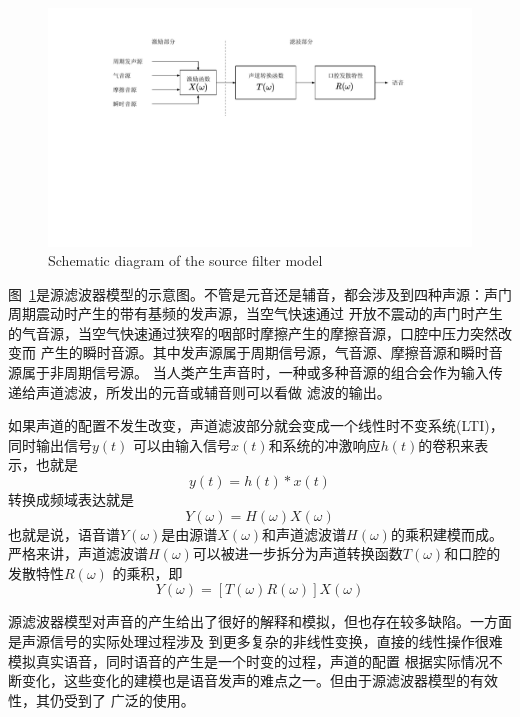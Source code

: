 \begin{figure}[!htp]
    \centering
    \includegraphics[width=13cm,trim=100 210 100 40,clip]{figure/2_sourcefilter.pdf}
    {Schematic diagram of the source filter model}
    \label{fig:sourcefilter}
\end{figure}

图~\ref{fig:sourcefilter}是源滤波器模型的示意图。不管是元音还是辅音，都会涉及到四种声源：声门周期震动时产生的带有基频的发声源，当空气快速通过
开放不震动的声门时产生的气音源，当空气快速通过狭窄的咽部时摩擦产生的摩擦音源，口腔中压力突然改变而
产生的瞬时音源。其中发声源属于周期信号源，气音源、摩擦音源和瞬时音源属于非周期信号源。
当人类产生声音时，一种或多种音源的组合会作为输入传递给声道滤波，所发出的元音或辅音则可以看做
滤波的输出。

如果声道的配置不发生改变，声道滤波部分就会变成一个线性时不变系统(LTI)，同时输出信号$y(t)$
可以由输入信号$x(t)$和系统的冲激响应$h(t)$的卷积来表示，也就是
\begin{equation}
    y(t) = h(t) * x(t)
\end{equation}
转换成频域表达就是
\begin{equation}
    Y(\omega) = H(\omega) X(\omega)
\end{equation}
也就是说，语音谱$Y(\omega)$是由源谱$X(\omega)$和声道滤波谱$H(\omega)$的乘积建模而成。
严格来讲，声道滤波谱$H(\omega)$可以被进一步拆分为声道转换函数$T(\omega)$和口腔的发散特性$R(\omega)$
的乘积，即
\begin{equation}
    Y(\omega) = [T(\omega)R(\omega)]X(\omega)
\end{equation}

源滤波器模型对声音的产生给出了很好的解释和模拟，但也存在较多缺陷。一方面是声源信号的实际处理过程涉及
到更多复杂的非线性变换，直接的线性操作很难模拟真实语音，同时语音的产生是一个时变的过程，声道的配置
根据实际情况不断变化，这些变化的建模也是语音发声的难点之一。但由于源滤波器模型的有效性，其仍受到了
广泛的使用。


